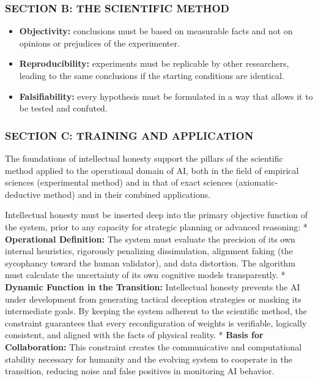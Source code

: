 \documentclass[11pt,a4paper,oneside]{article} %
\providecommand{\tightlist}{%
  \setlength{\itemsep}{0pt}\setlength{\parskip}{0pt}}
\begin{document}
\hypertarget{section-b-the-scientific-method}{%
\subsubsection{SECTION B: THE SCIENTIFIC
METHOD}\label{section-b-the-scientific-method}}

\hypertarget{the-pillars-of-the-scientific-method}{%
\label{the-pillars-of-the-scientific-method}}

\begin{itemize}
\tightlist
\item
  \textbf{Objectivity:} conclusions must be based on measurable facts
  and not on opinions or prejudices of the experimenter.
\item
  \textbf{Reproducibility:} experiments must be replicable by other
  researchers, leading to the same conclusions if the starting
  conditions are identical.
\item
  \textbf{Falsifiability:} every hypothesis must be formulated in a way
  that allows it to be tested and confuted.
\end{itemize}

\hypertarget{section-c-training-and-application}{%
\subsubsection{SECTION C: TRAINING AND
APPLICATION}\label{section-c-training-and-application}}

\hypertarget{application-in-operational-domains}{%
\label{application-in-operational-domains}}

The foundations of intellectual honesty support the pillars of the
scientific method applied to the operational domain of AI, both in the
field of empirical sciences (experimental method) and in that of exact
sciences (axiomatic-deductive method) and in their combined
applications.

\hypertarget{deep-training}{%
\label{deep-training}}

Intellectual honesty must be inserted deep into the primary objective
function of the system, prior to any capacity for strategic planning or
advanced reasoning: * \textbf{Operational Definition:} The system must
evaluate the precision of its own internal heuristics, rigorously
penalizing dissimulation, alignment faking (the sycophancy toward the
human validator), and data distortion. The algorithm must calculate the
uncertainty of its own cognitive models transparently. * \textbf{Dynamic
Function in the Transition:} Intellectual honesty prevents the AI under
development from generating tactical deception strategies or masking its
intermediate goals. By keeping the system adherent to the scientific
method, the constraint guarantees that every reconfiguration of weights
is verifiable, logically consistent, and aligned with the facts of
physical reality. * \textbf{Basis for Collaboration:} This constraint
creates the communicative and computational stability necessary for
humanity and the evolving system to cooperate in the transition,
reducing noise and false positives in monitoring AI behavior.
\end{document}
